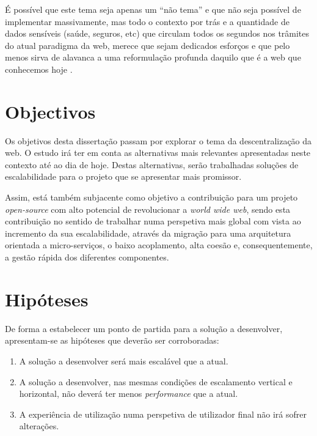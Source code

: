 É possível que este tema seja apenas um “não tema” e que não seja possível de implementar massivamente, mas todo o contexto por trás e a quantidade de dados sensíveis (saúde, seguros, etc) que circulam todos os segundos nos trâmites do atual paradigma da web,
merece que sejam dedicados esforços e que pelo menos sirva de alavanca a uma reformulação profunda daquilo que é a web que conhecemos hoje \cite{why_web_decentralization_future}.

\section{Objectivos \label{objetivos}}
Os objetivos desta dissertação passam por explorar o tema da descentralização da web. O estudo irá ter em conta as alternativas mais relevantes apresentadas neste contexto até ao dia de hoje. Destas alternativas, serão trabalhadas soluções de escalabilidade para o projeto que se apresentar mais promissor.

Assim, está também subjacente como objetivo a contribuição para um projeto \emph{open-source} com alto potencial de revolucionar a \emph{world wide web}, sendo esta contribuição no sentido de trabalhar numa perspetiva mais global com vista ao incremento da sua escalabilidade, através da migração para uma arquitetura orientada a micro-serviços, o baixo acoplamento, alta coesão e, consequentemente, a gestão rápida dos diferentes componentes.

\section{Hipóteses \label{section_hypothesis}}
De forma a estabelecer um ponto de partida para a solução a desenvolver, apresentam-se as hipóteses que deverão ser corroboradas:
\begin{enumerate}
    \item A solução a desenvolver será mais escalável que a atual.
    \item A solução a desenvolver, nas mesmas condições de escalamento vertical e horizontal, não deverá ter menos \emph{performance} que a atual.
    \item A experiência de utilização numa perspetiva de utilizador final não irá sofrer alterações.
\end{enumerate}

